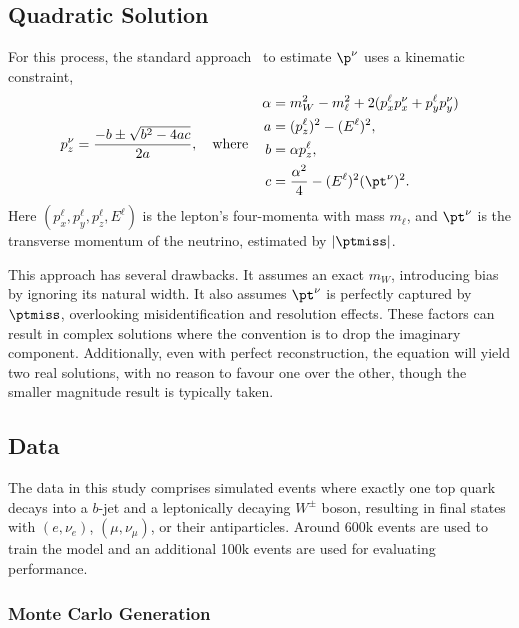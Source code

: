 \subsection{Quadratic Solution}

For this process, the standard approach~\cite{Quad1, Quad2, Quad4, Quad5} to estimate $\p^\nu$ uses a kinematic constraint,
\begin{equation}
    \label{eq:quadratic}
    p_z^\nu = \frac{-b \pm \sqrt{b^2-4ac}}{2a}, \quad \text{where} \quad
    \begin{aligned}
        \alpha & = m_W^2 - m_\ell^2+2(p_x^\ell p_x^\nu+p_y^\ell p_y^\nu) \\
        a      & = (p_z^\ell)^2 - (E^\ell)^2,                            \\
        b      & = \alpha p_z^\ell,                                      \\
        c      & = \frac{\alpha^2}{4}-(E^\ell)^2(\pt^\nu)^2.
    \end{aligned}
\end{equation}
Here $(p_x^\ell, p_y^\ell, p_z^\ell, E^\ell)$ is the lepton's four-momenta with mass $m_\ell$, and $\pt^\nu$ is the transverse momentum of the neutrino, estimated by $|\ptmiss|$.

This approach has several drawbacks.
It assumes an exact $m_W$, introducing bias by ignoring its natural width.
It also assumes $\pt^\nu$ is perfectly captured by $\ptmiss$, overlooking misidentification and resolution effects.
These factors can result in complex solutions where the convention is to drop the imaginary component.
Additionally, even with perfect reconstruction, the equation will yield two real solutions, with no reason to favour one over the other, though the smaller magnitude result is typically taken.

\subsection{Data}
\label{sec:nu_data}

The data in this study comprises simulated \ttbar events where exactly one top quark decays into a $b$-jet and a leptonically decaying $W^\pm$ boson, resulting in final states with $(e,\nu_e)$, $(\mu,\nu_\mu)$, or their antiparticles.
Around 600k events are used to train the model and an additional 100k events are used for evaluating performance.

\subsubsection{Monte Carlo Generation}

